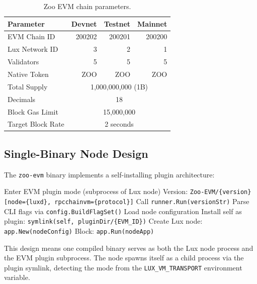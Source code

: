 \begin{table}[h]
\centering
\begin{tabular}{lrrr}
\toprule
\textbf{Parameter} & \textbf{Devnet} & \textbf{Testnet} & \textbf{Mainnet} \\
\midrule
EVM Chain ID & 200202 & 200201 & 200200 \\
Lux Network ID & 3 & 2 & 1 \\
Validators & 5 & 5 & 5 \\
Native Token & ZOO & ZOO & ZOO \\
Total Supply & \multicolumn{3}{c}{1,000,000,000 (1B)} \\
Decimals & \multicolumn{3}{c}{18} \\
Block Gas Limit & \multicolumn{3}{c}{15,000,000} \\
Target Block Rate & \multicolumn{3}{c}{2 seconds} \\
\bottomrule
\end{tabular}
\caption{Zoo EVM chain parameters.}
\end{table}

\subsection{Single-Binary Node Design}

The \texttt{zoo-evm} binary implements a self-installing plugin architecture:

\begin{algorithm}
\caption{Zoo EVM Self-Installing Plugin}
\begin{algorithmic}[1]
  \STATE Enter EVM plugin mode (subprocess of Lux node)
  \STATE Version: \texttt{Zoo-EVM/\{version\} [node=\{luxd\}, rpcchainvm=\{protocol\}]}
  \STATE Call \texttt{runner.Run(versionStr)}
\ELSE
  \STATE Parse CLI flags via \texttt{config.BuildFlagSet()}
  \STATE Load node configuration
  \STATE Install self as plugin: \texttt{symlink(self, pluginDir/\{EVM\_ID\})}
  \STATE Create Lux node: \texttt{app.New(nodeConfig)}
  \STATE Block: \texttt{app.Run(nodeApp)}
\ENDIF
\end{algorithmic}
\end{algorithm}

This design means one compiled binary serves as both the Lux node process and the EVM plugin subprocess. The node spawns itself as a child process via the plugin symlink, detecting the mode from the \texttt{LUX\_VM\_TRANSPORT} environment variable.

